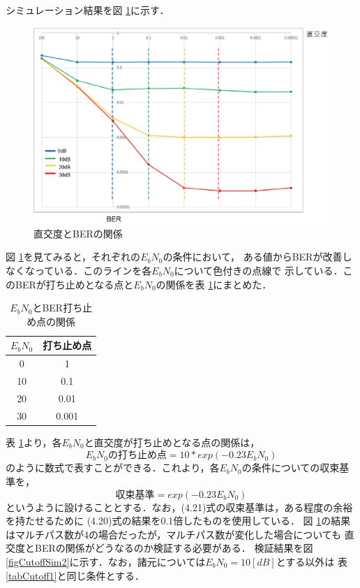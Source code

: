 シミュレーション結果を図 \ref{figCutoffSim1}に示す．

\begin{figure}[h]
    \centering
    \includegraphics[width=0.95\linewidth]{chapter4/figure/CutoffSim1.eps}
    \caption{直交度とBERの関係}
    \label{figCutoffSim1}
\end{figure}

図 \ref{figCutoffSim1}を見てみると，それぞれの$E_bN_0$の条件において，
ある値からBERが改善しなくなっている．このラインを各$E_bN_0$について色付きの点線で
示している．このBERが打ち止めとなる点と$E_bN_0$の関係を表 \ref{tabCutoff2}にまとめた．

\begin{table}[h]
    \begin{tabular}{|c|c|} \hline
        $E_bN_0$ & 打ち止め点 \\ \hline
        0 & 1 \\ \hline
        10 & 0.1 \\ \hline
        20 & 0.01 \\ \hline
        30 & 0.001 \\ \hline
    \end{tabular}
    \centering
    \caption{$E_bN_0$とBER打ち止め点の関係}
    \label{tabCutoff2}
\end{table}

表 \ref{tabCutoff2}より，各$E_bN_0$と直交度が打ち止めとなる点の関係は，
\begin{equation}
    E_bN_0の打ち止め点 = 10*exp(-0.23E_bN_0)
\end{equation}
のように数式で表すことができる．これより，各$E_bN_0$の条件についての収束基準を，
\begin{equation}
    収束基準 = exp(-0.23E_bN_0)
\end{equation}
というように設けることとする．なお，(4.21)式の収束基準は，ある程度の余裕を持たせるために
(4.20)式の結果を0.1倍したものを使用している．
図 \ref{figCutoffSim1}の結果はマルチパス数が4の場合だったが，マルチパス数が変化した場合についても
直交度とBERの関係がどうなるのか検証する必要がある．
検証結果を図 \ref{figCutoffSim2}に示す．なお，諸元については$E_bN_0=10[dB]$とする以外は
表 \ref{tabCutoff1}と同じ条件とする．

